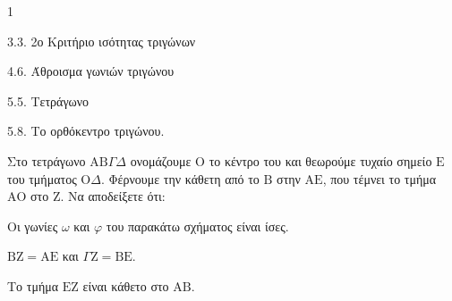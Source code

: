 \begin{ylh}{1}
    \item 3.3. 2ο Κριτήριο ισότητας τριγώνων
    \item 4.6. Άθροισμα γωνιών τριγώνου
    \item 5.5. Τετράγωνο
    \item 5.8. Το ορθόκεντρο τριγώνου.
\end{ylh}
Στο τετράγωνο $\mathrm{A}\mathrm{B}\Gamma\Delta$ ονομάζουμε $\mathrm{O}$ το κέντρο του και θεωρούμε τυχαίο σημείο $\mathrm{E}$ του τμήματος $\mathrm{O}\Delta$. Φέρνουμε την κάθετη από το $\mathrm{B}$ στην $\mathrm{A}\mathrm{E}$, που τέμνει το τμήμα $\mathrm{A}\mathrm{O}$ στο $\mathrm{Z}$.
Να αποδείξετε ότι:
\begin{alist}
    \item Οι γωνίες $\omega$ και $\varphi$ του παρακάτω σχήματος είναι ίσες. 
    \item $\mathrm{B}\mathrm{Z} = \mathrm{A}\mathrm{E}$ και $\Gamma\mathrm{Z} = \mathrm{B}\mathrm{E}$. 
    \item Το τμήμα $\mathrm{E}\mathrm{Z}$ είναι κάθετο στο $\mathrm{A}\mathrm{B}$. 
\end{alist}
